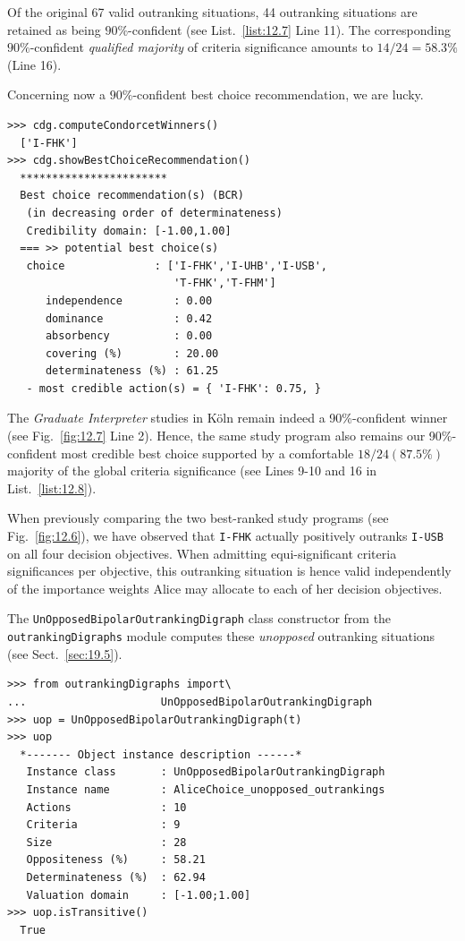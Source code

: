 Of the original 67 valid outranking situations, 44 outranking situations are retained as being $90\%$-confident (see List.~\vref{list:12.7} Line 11). The corresponding $90\%$-confident \emph{qualified majority} of criteria significance amounts to $14/24 = 58.3\%$ (Line 16).  

Concerning now a $90\%$-confident best choice recommendation, we are lucky. 
\begin{lstlisting}[caption={Computing the $90\%$-confident best choice recommendation.},label=list:12.8]
>>> cdg.computeCondorcetWinners()
  ['I-FHK']
>>> cdg.showBestChoiceRecommendation()
  ***********************
  Best choice recommendation(s) (BCR)
   (in decreasing order of determinateness)   
   Credibility domain: [-1.00,1.00]
  === >> potential best choice(s)
   choice              : ['I-FHK','I-UHB','I-USB',
                          'T-FHK','T-FHM']
      independence        : 0.00
      dominance           : 0.42
      absorbency          : 0.00
      covering (%)        : 20.00
      determinateness (%) : 61.25
   - most credible action(s) = { 'I-FHK': 0.75, }
\end{lstlisting}

The \emph{Graduate Interpreter} studies in Köln remain indeed a 90\%-confident \Condorcet winner (see Fig.~\vref{fig:12.7} Line 2). Hence, the same study program also remains our 90\%-confident most credible best choice supported by a comfortable $18/24 (87.5\%)$ majority of the global criteria significance (see Lines 9-10 and 16 in List.~\vref{list:12.8}).

When previously comparing the two best-ranked study programs (see Fig.~\vref{fig:12.6}), we have observed that \texttt{I-FHK} actually positively outranks \texttt{I-USB} on all four decision objectives. When admitting equi-significant criteria significances per objective, this outranking situation is hence valid independently of the importance weights Alice may allocate to each of her decision objectives. 

The \texttt{UnOpposedBipolarOutrankingDigraph} class constructor from the \texttt{outrankingDigraphs} module computes these \emph{unopposed} outranking situations (see Sect.~\ref{sec:19.5}).
\begin{lstlisting}[caption={Computing the unopposed outranking situations},label=list:12.9]
>>> from outrankingDigraphs import\
...                     UnOpposedBipolarOutrankingDigraph
>>> uop = UnOpposedBipolarOutrankingDigraph(t)
>>> uop
  *------- Object instance description ------*
   Instance class       : UnOpposedBipolarOutrankingDigraph
   Instance name        : AliceChoice_unopposed_outrankings
   Actions              : 10
   Criteria             : 9
   Size                 : 28
   Oppositeness (%)     : 58.21
   Determinateness (%)  : 62.94
   Valuation domain     : [-1.00;1.00]
>>> uop.isTransitive()
  True
\end{lstlisting}

